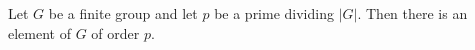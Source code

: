 \documentclass[12pt]{article}
\begin{document}
Let $G$ be a finite group and let $p$ be a prime dividing $|G|$.  Then there is an element of $G$ of order $p$.
\end{document}

